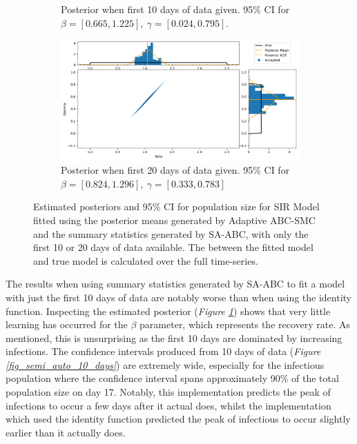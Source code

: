 \documentclass[11pt,a4paper]{article}
\theoremstyle{break}
\begin{document}
\begin{figure}[H]
{\begin{subfigure}{.45\paperwidth}
        \caption{Posterior when first 10 days of data given. 95\% CI for $\beta=[0.665,1.225],\ \gamma=[0.024,0.795]$.}
        \label{fig_semi_auto_10_days_posterior}
      \end{subfigure}
      \begin{subfigure}{.45\paperwidth}
        \centering
        \includegraphics[width=1\textwidth]{Semi_Auto_ABC_SMC_20_days_joint_posterior.png}
        \caption{Posterior when first 20 days of data given. 95\% CI for $\beta=[0.824,1.296],\ \gamma=[0.333,0.783]$}
        \label{fig_semi_auto_20_days_posterior}
      \end{subfigure}
    }
    \caption{Estimated posteriors and 95\% CI for population size for SIR Model fitted using the posterior means generated by Adaptive ABC-SMC and the summary statistics generated by SA-ABC, with only the first 10 or 20 days of data available. The between the fitted model and true model is calculated over the full time-series.}
    \label{fig_semi_auto_restricted_data}
  \end{figure}

  \par The results when using summary statistics generated by SA-ABC to fit a model with just the first 10 days of data are notably worse than when using the identity function. Inspecting the estimated posterior (\textit{Figure \ref{fig_semi_auto_10_days_posterior}}) shows that very little learning has occurred for the $\beta$ parameter, which represents the recovery rate. As mentioned, this is unsurprising as the first 10 days are dominated by increasing infections. The confidence intervals produced from 10 days of data (\textit{Figure \ref{fig_semi_auto_10_days}}) are extremely wide, especially for the infectious population where the confidence interval spans approximately 90\% of the total population size on day 17. Notably, this implementation predicts the peak of infections to occur a few days after it actual does, whilst the implementation which used the identity function predicted the peak of infectious to occur slightly earlier than it actually does.
\end{document}
